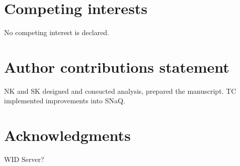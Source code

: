 \documentclass[unnumsec,webpdf,contemporary,large]{oup-authoring-template}%
\theoremstyle{thmstyleone}%
\theoremstyle{thmstyletwo}%
\theoremstyle{thmstylethree}%
\begin{document}
\section{Competing interests}
No competing interest is declared.

\section{Author contributions statement}
NK and SK designed and consucted analysis, prepared the manuscript. TC implemented improvements into SNaQ. 

\section{Acknowledgments}
WID Server? 

%
%
%
%
\end{document}
